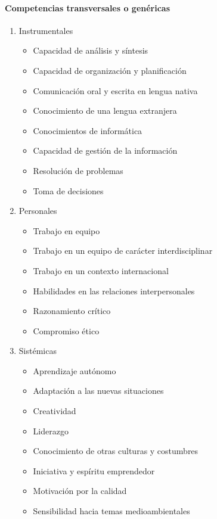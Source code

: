 \paragraph{Competencias transversales o genéricas}

\begin{enumerate}
\item Instrumentales
\begin{itemize}
\item Capacidad de análisis y síntesis
\item Capacidad de organización y planificación
\item Comunicación oral y escrita en lengua nativa
\item Conocimiento de una lengua extranjera
\item Conocimientos de informática
\item Capacidad de gestión de la información
\item Resolución de problemas
\item Toma de decisiones
\end{itemize}
\item Personales
\begin{itemize}
\item Trabajo en equipo
\item Trabajo en un equipo de carácter interdisciplinar
\item Trabajo en un contexto internacional
\item Habilidades en las relaciones interpersonales
\item Razonamiento crítico
\item Compromiso ético
\end{itemize}
\item Sistémicas
\begin{itemize}
\item Aprendizaje autónomo
\item Adaptación a las nuevas situaciones
\item Creatividad
\item Liderazgo
\item Conocimiento de otras culturas y costumbres
\item Iniciativa y espíritu emprendedor
\item Motivación por la calidad
\item Sensibilidad hacia temas medioambientales
\end{itemize}
\end{enumerate}

